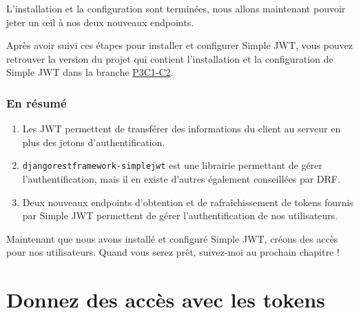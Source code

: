 L’installation et la configuration sont terminées, nous allons maintenant pouvoir jeter un œil à nos deux nouveaux endpoints.
\begin{theorem}
Après avoir suivi ces étapes pour installer et configurer Simple JWT, vous pouvez retrouver la version du projet qui contient l’installation et la configuration de Simple JWT dans la branche \href{https://github.com/OpenClassrooms-Student-Center/7192416_APIs_DRF/tree/P3C1-C2}{P3C1-C2}.
\end{theorem}

\subsubsection{En résumé}
\begin{enumerate}
\item Les JWT permettent de transférer des informations du client au serveur en plus des jetons d’authentification.
\item {\tt djangorestframework-simplejwt}  est une librairie permettant de gérer l’authentification, mais il en existe d’autres également conseillées par DRF.
\item Deux nouveaux endpoints d’obtention et de rafraîchissement de tokens fournis par Simple JWT permettent de gérer l’authentification de nos utilisateurs.
\end{enumerate}

Maintenant que nous avons installé et configuré Simple JWT, créons des accès pour nos utilisateurs. Quand vous serez prêt, suivez-moi au prochain chapitre !

\section{Donnez des accès avec les tokens}

